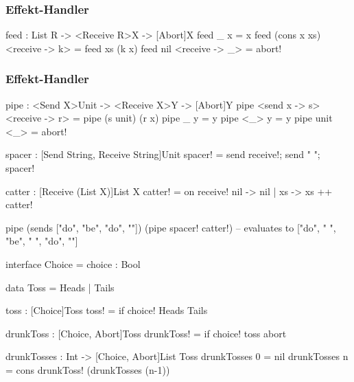 \documentclass{beamer}
\begin{document}
\begin{frame}[fragile]
  \frametitle{Effekt-Handler}

\begin{frankcode}
feed : List R -> <Receive R>X -> [Abort]X
feed _           x              = x
feed (cons x xs) <receive -> k> = feed xs (k x)
feed nil         <receive -> _> = abort!
\end{frankcode}

\end{frame}

\begin{frame}[fragile]
  \frametitle{Effekt-Handler}

\begin{frankcode}
pipe : <Send X>Unit -> <Receive X>Y -> [Abort]Y
pipe <send x -> s> <receive -> r> = pipe (s unit) (r x)
pipe _             y              = y
pipe <_>           y              = y
pipe unit          <_>            = abort!
\end{frankcode}

\end{frame}

\begin{frame}[fragile]

\begin{frankcode}
spacer : [Send String, Receive String]Unit
spacer! = send receive!; send " "; spacer!

catter : [Receive (List X)]List X
catter! =
  on receive!
    { nil -> nil
    | xs  -> xs ++ catter!
    }

pipe
  (sends ["do", "be", "do", ""])
  (pipe spacer! catter!)
-- evaluates to ["do", " ", "be", " ", "do", ""]
\end{frankcode}

\end{frame}

\begin{frame}[fragile]

\begin{frankcode}
interface Choice = choice : Bool

data Toss = Heads | Tails

toss : [Choice]Toss
toss! = if choice! {Heads} {Tails}

drunkToss : [Choice, Abort]Toss
drunkToss! = if choice! toss abort

drunkTosses : Int -> [Choice, Abort]List Toss
drunkTosses 0 = nil
drunkTosses n = cons drunkToss! (drunkTosses (n-1))

\end{frankcode}

\end{frame}
\end{document}
